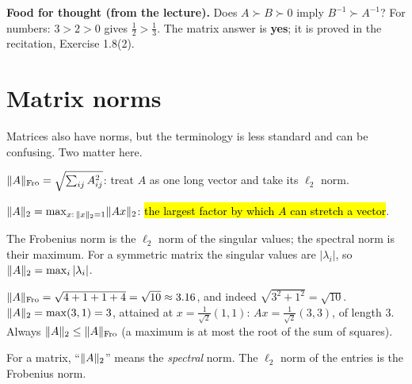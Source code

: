 \begin{plainbox}
\textbf{Food for thought (from the lecture).} Does $A\succ B\succ0$ imply $B^{-1}\succ A^{-1}$? For numbers: $3>2>0$ gives $\frac12>\frac13$.
The matrix answer is \textbf{yes}; it is proved in the recitation, Exercise 1.8(2).
\end{plainbox}

\section{Matrix norms}

Matrices also have norms, but the terminology is less standard and can be confusing. Two matter here.

\begin{defn}
$\lVert A\rVert_{\mathrm{Fro}} = \sqrt{\sum_{ij}A_{ij}^2}$: treat $A$ as one long vector and take its $\ell_2$ norm.
\end{defn}

\begin{defn}
$\lVert A\rVert_2 = \max_{x:\,\lVert x\rVert_2=1}\lVert Ax\rVert_2$: \hl{the largest factor by which $A$ can stretch a vector}.
\end{defn}

\begin{intuition}
The Frobenius norm is the $\ell_2$ norm of the singular values; the spectral norm is their maximum. For a symmetric matrix the singular
values are $|\lambda_i|$, so $\lVert A\rVert_2 = \max_i|\lambda_i|$.
\end{intuition}

\begin{example}[Both norms of $A=\begin{pmatrix}2&1\\1&2\end{pmatrix}$]
$\lVert A\rVert_{\mathrm{Fro}}=\sqrt{4+1+1+4}=\sqrt{10}\approx3.16$, and indeed $\sqrt{3^2+1^2}=\sqrt{10}$.
$\lVert A\rVert_2 = \max(3,1) = 3$, attained at $x=\frac1{\sqrt2}(1,1)$: $Ax = \frac1{\sqrt2}(3,3)$, of length $3$.
Always $\lVert A\rVert_2\le\lVert A\rVert_{\mathrm{Fro}}$ (a maximum is at most the root of the sum of squares).
\end{example}

\begin{pitfall}
For a matrix, ``$\lVert A\rVert_2$'' means the \emph{spectral} norm. The $\ell_2$ norm of the entries is the Frobenius norm.
\end{pitfall}

